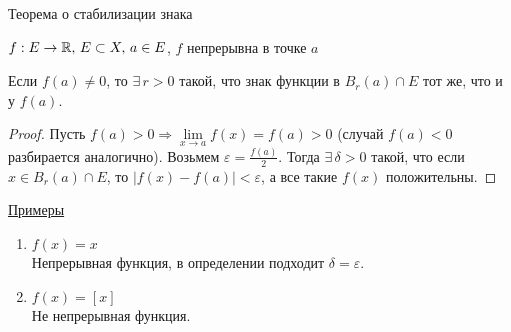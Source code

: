 \begin{theorem-non}
    Теорема о стабилизации знака

$f : E \to \mathbb{R}, \, E \subset X, \, a \in E$, $f$ непрерывна в точке $a$

Если $f(a) \neq 0$, то $\exists \, r > 0$ такой, что знак функции в $B_r(a) \cap E$ тот же, что и у $f(a)$.
\end{theorem-non}
\begin{proof}
    Пусть $f(a) > 0 \Rightarrow \lim\limits_{x \to a} f(x) = f(a) > 0$ (случай $f(a) < 0$ разбирается аналогично). Возьмем $\varepsilon = \frac{f(a)}{2}$. 
    Тогда $\exists \, \delta > 0$ такой, что если $x \in B_r(a) \cap E$, то $|f(x) - f(a)| < \varepsilon$,
    а все такие $f(x)$ положительны.
\end{proof}
\underline{Примеры}
\begin{enumerate}
    \item $f(x) = x$ \\ Непрерывная функция, в определении подходит $\delta = \varepsilon$.
    \item $f(x) = [x]$ \\ Не непрерывная функция.
\end{enumerate}
